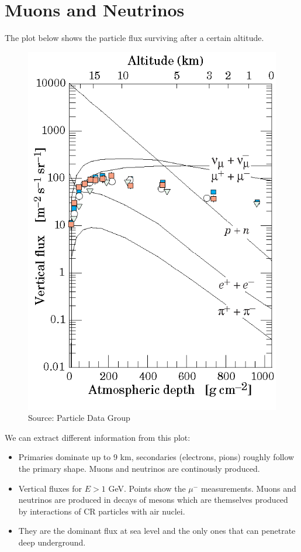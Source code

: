 \documentclass[
  letterpaper,
  DIV=11,
  numbers=noendperiod]{scrreprt}
\begin{document}
\section{Muons and Neutrinos}\label{muons-and-neutrinos}

The plot below shows the particle flux surviving after a certain
altitude.

\begin{figure}[H]

{\centering \includegraphics{images/cr_fig3_07.png}

}

\caption{Source: Particle Data Group}

\end{figure}%

We can extract different information from this plot:

\begin{itemize}
\item
  Primaries dominate up to 9 km, secondaries (electrons, pions) roughly
  follow the primary shape. Muons and neutrinos are continously
  produced.
\item
  Vertical fluxes for \(E > 1\) GeV. Points show the \(\mu^-\)
  measurements. Muons and neutrinos are produced in decays of mesons
  which are themselves produced by interactions of CR particles with air
  nuclei.
\item
  They are the dominant flux at sea level and the only ones that can
  penetrate deep underground.
\end{itemize}
\end{document}
